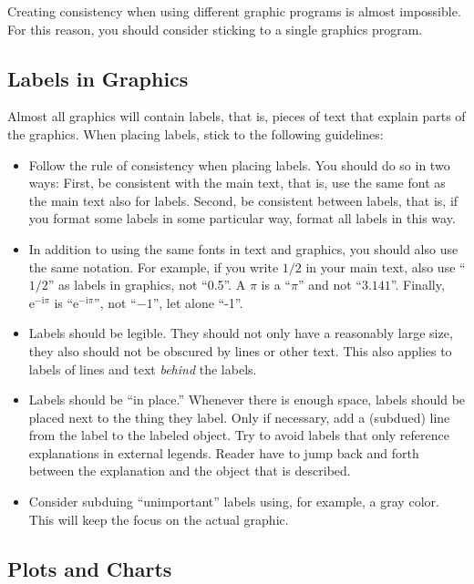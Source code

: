 Creating consistency when using different graphic programs is almost
impossible. For this reason, you should consider sticking to a single
graphics program.


\subsection{Labels in Graphics}

Almost all graphics will contain labels, that is, pieces of text that
explain parts of the graphics. When placing labels, stick to the
following guidelines:

\begin{itemize}
\item
  Follow the rule of consistency when placing labels. You should do
  so in two ways: First, be consistent with the main text, that is,
  use the same font as the main text also for labels. Second, be
  consistent between labels, that is, if you format some labels in
  some particular way, format all labels in this way.
\item
  In addition to using the same fonts in text and graphics, you should
  also use the same notation. For example, if you write $1/2$ in your
  main text, also use ``$1/2$'' as labels in graphics, not
  ``0.5''. A $\pi$ is a ``$\pi$'' and not ``$3.141$''. Finally,
  $\mathrm e^{-\mathrm i \pi}$ is ``$\mathrm e^{-\mathrm i \pi}$'',
  not ``$-1$'', let alone ``-1''.
\item
  Labels should be legible. They should not only have a reasonably
  large size, they also should not be obscured by lines or other
  text. This also applies to labels of lines and text \emph{behind} the
  labels.
\item
  Labels should be ``in  place.'' Whenever there is enough space,
  labels should be placed next to the thing they label. Only if
  necessary, add a (subdued) line from the label to the labeled
  object. Try to avoid labels that only reference explanations in
  external legends. Reader have to jump back and forth between the
  explanation and the object that is described.
\item
  Consider subduing ``unimportant'' labels using, for example, a gray
  color. This will keep the focus on the actual graphic.
\end{itemize}



\subsection{Plots and Charts}

